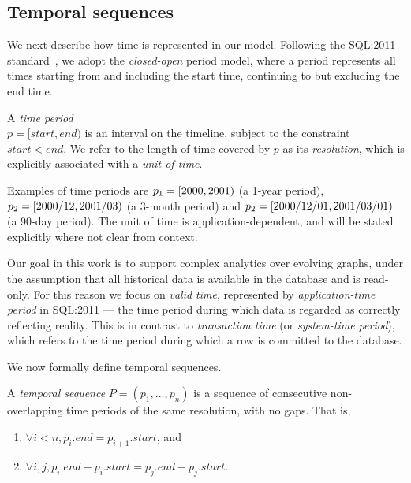\subsection{Temporal sequences}
\label{sec:model:time}

We next describe how time is represented in our model.  Following the
SQL:2011 standard~\cite{DBLP:journals/sigmod/KulkarniM12}, we adopt
the {\em closed-open} period model, where a period represents all
times starting from and including the start time, continuing to but
excluding the end time.

\begin{definition}
A {\em time period} \\$p = [start, end)$ is an interval on the
  timeline, subject to the constraint $start < end$.  We refer to the
  length of time covered by $p$ as its {\em resolution}, which is
  explicitly associated with a {\em unit of time}.
\label{def:period} 
\end{definition}

Examples of time periods are $p_1=[2000,2001)$ (a 1-year
  period), $p_2=[2000/12,2001/03)$ (a 3-month period)
    and $p_2=[\mathsf 2000/12/01,\mathsf 2001/03/01)$ (a 90-day
      period).  The unit of time is application-dependent, and will be
      stated explicitly where not clear from context.

Our goal in this work is to support complex analytics over evolving
graphs, under the assumption that all historical data is available in
the database and is read-only.  For this reason we focus on {\em valid
  time}, represented by {\em application-time period} in SQL:2011 ---
the time period during which data is regarded as correctly reflecting
reality.  This is in contrast to {\em transaction time} (or {\em
  system-time period}), which refers to the time period during which a
row is committed to the database.

We now formally define temporal sequences.

\begin{definition} 
A {\em temporal sequence} $P = (p_1, \ldots, p_n)$ is a
sequence of consecutive non-overlapping time periods of the same
resolution, with no gaps.  That is,

\begin{enumerate}
\item $\forall i < n, p_i.end = p_{i+1}.start$, and 
\item $\forall i, j, p_i.end - p_i.start = p_j.end - p_j.start$.
\end{enumerate}
\label{def:tseq} 
\end{definition}

